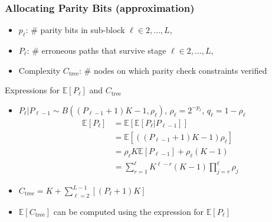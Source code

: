 
\begin{frame}
\frametitle{Allocating Parity Bits (approximation)}
\begin{itemize}
\item $p_{\ell}$: \# parity bits in sub-block $\ell \in 2, \ldots, L$,
\item $P_{\ell}$: \# erroneous paths that survive stage $\ell \in 2, \ldots, L$,
\item Complexity $C_{\mathrm{tree}}$: \# nodes on which parity check constraints verified
\end{itemize}
\vfill
\begin{block}{Expressions for $\mathbb{E}[P_{\ell}]$ and $C_{\mathrm{tree}}$}
\begin{itemize}
\item $P_{\ell} \lvert P_{\ell-1} \sim B((P_{\ell-1}+1)K-1,\rho_{\ell})$, $\rho_{\ell}=2^{-p_{\ell}}$, $q_{\ell}=1-\rho_{\ell}$
\begin{align*}
\mathbb{E}[P_{\ell}] &= \mathbb{E}[ \mathbb{E}[P_{\ell} \lvert P_{\ell-1}]] \\
&= \mathbb{E}[((P_{\ell-1}+1)K-1)\rho_{\ell}] \\
&= \rho_{\ell} K\mathbb{E}[P_{\ell-1}] + \rho_{\ell}(K-1) \\
&= \sum_{r=1}^{\ell} K^{\ell-r}(K-1) \prod_{j=r}^{\ell}\rho_j
\end{align*}
\item $C_{\mathrm{tree}} = K + \sum_{\ell=2}^{L-1}\left[(P_{\ell} + 1)K\right]$
\item $\mathbb{E}[C_{\mathrm{tree}}]$ can be computed using the expression for $\mathbb{E}[P_{\ell}]$
\end{itemize}
\end{block}
\end{frame}


